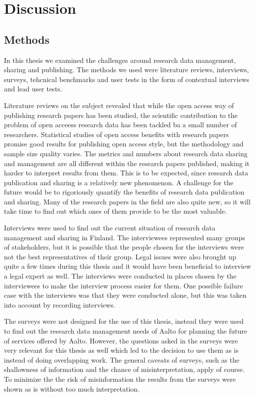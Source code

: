 \chapter{Discussion}
\label{chapter:discussion}

\section{Methods}

In this thesis we examined the challenges around research data management,
sharing and publishing. The methods we used were literature reviews,
interviews, surveys, tehcnical benchmarks and user tests in the form of contextual
interviews and lead user tests.

Literature reviews on the subject revealed that while the open access way of
publishing research papers has been studied, the scientific contribution to
the problem of open acceess research data has been tackled ba a small number
of researchers. Statistical studies of open access benefits with research
papers promise good results for publishing open access style, but the
methodology and sample size quality varies. The metrics and numbers about
research data sharing and management are all different within the research
papers published, making it harder to interpret results from them. This is to
be expected, since research data publication and sharing is a relatively new
phenomenon. A challenge for the future would be to rigoriously quantify the
benefits of research data publication and sharing. Many of the research papers
in the field are also quite new, so it will take time to find out which ones
of them provide to be the most valuable.

Interviews were used to find out the current situation of research data
management and sharing in Finland. The interviewees represented many groups
of stakeholders, but it is possible that the people chosen for the interviews
were not the best representatives of their group. Legal issues were also
brought up quite a few times during this thesis and it would have been
beneficial to interview a legal expert as well. The interviews were conducted
in places chosen by the interviewees to make the interview process easier
for them. One possible failure case with the interviews was that they were
conducted alone, but this was taken into account by recording interviews.

The surveys were not designed for the use of this thesis, instead they were used
to find out the research data management needs of Aalto for planning the
future of services offered by Aalto. However, the questions asked in the
surveys were very relevant for this thesis as well which led to the decision
to use them as is instead of doing overlapping work. The general caveats of
surveys, such as the shallowness of information and the chance of
misinterpretation, apply of course. To minimize the the risk of misinformation
the results from the surveys were shown as is without too much interpretation.

